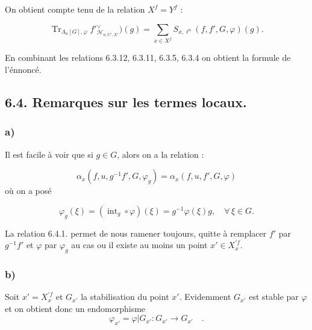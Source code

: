 \documentclass[11pt]{article}
\providecommand{\Tr}{\operatorname{Tr}}
\providecommand{\Tr}{\operatorname{Tr}}
\providecommand{\Tr}{\operatorname{Tr}}
\providecommand{\Tr}{\operatorname{Tr}}
\providecommand{\La}{\Lambda}
\providecommand{\Tr}{\operatorname{Tr}}
\begin{document}
On
obtient compte tenu de la relation $X^f=Y^f$ :

\begin{equation}\tag{6.3.12}
\Tr_{\La_n[G],\varphi}f'{}^\vee_{\mathcal{H}_{n,U',X'}})(g)=\sum_{x\in X^f}S_{x,\ell^n}(f,f',G,\varphi)(g).
\end{equation}

En combinant les relations 6.3.12, 6.3.11, 6.3.5, 6.3.4 on obtient la formule de l'énnoncé.

\subsection*{6.4. Remarques sur les termes locaux.}
\subsubsection*{a)} Il est facile à voir que si $g\in G$, alors on a la relation :

\begin{equation}\tag{6.4.1}
\alpha_x(f,u,g^{-1}f',G,\varphi_g)=\alpha_x(f,u,f',G,\varphi)
\end{equation}
où on a posé

\begin{equation}\tag{6.4.2}
\varphi_g(\xi)=(\operatorname{int}_g\circ\varphi)(\xi)=g^{-1}\varphi(\xi)g,
\quad \forall\,\xi\in G.
\end{equation}

La relation 6.4.1. permet de nous ramener toujours, quitte à remplacer $f'$ par $g^{-1}f'$ et $\varphi$ par $\varphi_g$ au cas ou il existe au moins un point $x'\in X_x^{\prime f}$.

\subsubsection*{b)} Soit $x'=X_x^{\prime f}$ et $G_{x'}$ la stabilisation du point $x'$. Evidemment $G_{x'}$ est stable par $\varphi$ et on obtient donc un endomorphisme%
\[
\varphi_{x'} = \varphi|G_{x'} : G_{x'} \longrightarrow G_{x'} \quad .
\]
\end{document}
